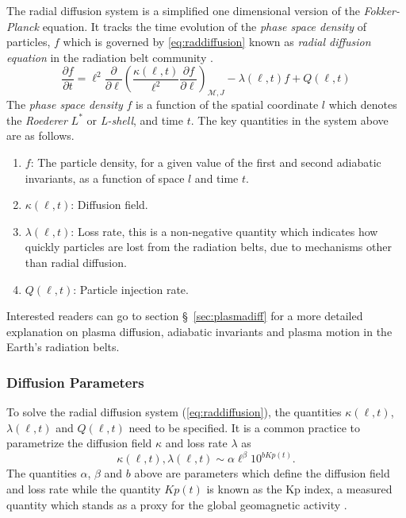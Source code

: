 The radial diffusion system is a simplified one dimensional version of the \emph{Fokker-Planck} 
equation. It tracks the time evolution of the \emph{phase space density} of particles, $f$ which is 
governed by \cref{eq:raddiffusion} known as \emph{radial diffusion equation} in the radiation belt 
community \citep{JGRA:JGRA9345}.
%
\begin{equation}\label{eq:raddiffusion}
  \frac{\partial{f}}{\partial{t}} = \ell^2 \frac{\partial}{\partial{\ell}} \left( 
    \frac{\kappa(\ell,t)}{\ell^{2}} \frac{\partial{f}}{\partial{\ell}}
  \right)_{\mathcal{M}, J} - \lambda(\ell,t) f + Q(\ell, t)
\end{equation}
%
The \emph{phase space density} $f$ is a function of the spatial coordinate $l$ which denotes the 
\emph{Roederer} $L^*$ or \emph{L-shell}, and time $t$. The key quantities in the system above are 
as follows.
%
\begin{enumerate}
\item $f$: The particle density, for a given value of the first and second adiabatic invariants, 
as a function of space $l$ and time $t$.
\item $\kappa(\ell, t)$: Diffusion field.
\item $\lambda(\ell, t)$: Loss rate, this is a non-negative quantity which indicates how quickly 
particles are lost from the radiation belts, due to mechanisms other than radial diffusion.
\item $Q(\ell, t)$: Particle injection rate.
\end{enumerate}
%
Interested readers can go to section \S~\ref{sec:plasmadiff} for a more detailed explanation on 
plasma diffusion, adiabatic invariants and plasma motion in the Earth's radiation belts. 

\subsubsection*{Diffusion Parameters}

To solve the radial diffusion system (\cref{eq:raddiffusion}), the quantities $\kappa(\ell, t)$, 
$\lambda(\ell, t)$ and $Q(\ell, t)$ need to be specified. It is a common practice 
\citetext{see \citealp{GRL:GRL10762}, \citealp{JGRA:JGRA15067}, \citealp{JGRA:JGRA18021} and
\citealp{GRL:GRL22815}} to parametrize the diffusion field $\kappa$ and loss rate $\lambda$ as 
%
\begin{equation}\label{eq:paramExp}
  \kappa(\ell, t), \lambda(\ell, t) \sim \alpha \ell^{\beta} 10^{b Kp(t)}.
\end{equation}
%
The quantities $\alpha$, $\beta$ and $b$ above are parameters which define the diffusion field and 
loss rate while the quantity $Kp(t)$ is known as the Kp index, a measured quantity which stands as 
a proxy for the global geomagnetic activity \citep{BartelsKp}.


